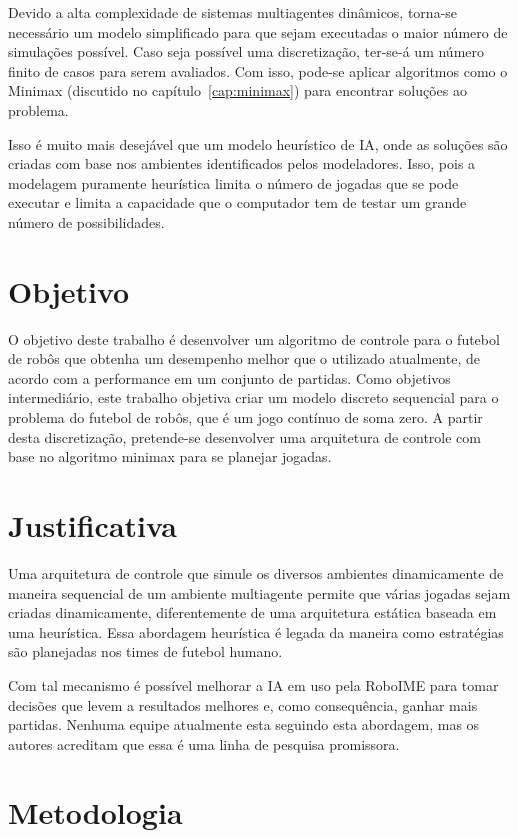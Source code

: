 Devido a alta complexidade de sistemas multiagentes dinâmicos, torna-se
necessário um modelo simplificado para que sejam executadas o maior número de
simulações possível.  Caso seja possível uma discretização, ter-se-á um número
finito de casos para serem avaliados. Com isso, pode-se aplicar algoritmos como
o Minimax (discutido no capítulo~\ref{cap:minimax}) para encontrar
soluções ao problema.

Isso é muito mais desejável que um modelo heurístico de IA, onde as soluções são
criadas com base nos ambientes identificados pelos modeladores. Isso, pois a
modelagem puramente heurística limita o número de jogadas que se pode executar e
limita a capacidade que o computador tem de testar um grande número de possibilidades.

\section{Objetivo}

O objetivo deste trabalho é desenvolver um algoritmo de controle para o futebol
de robôs que obtenha um desempenho melhor que o utilizado atualmente, de acordo
com a performance em um conjunto de partidas.
Como objetivos intermediário, este trabalho objetiva criar um modelo discreto
sequencial para o problema do futebol de robôs, que é um jogo contínuo de soma
zero.  A partir desta discretização, pretende-se desenvolver uma arquitetura de
controle com base no algoritmo minimax para se planejar jogadas.

\section{Justificativa}

Uma arquitetura de controle que simule os diversos ambientes dinamicamente de
maneira sequencial de um ambiente multiagente permite que várias jogadas sejam
criadas dinamicamente, diferentemente de uma arquitetura estática baseada em uma
heurística. Essa abordagem heurística é legada da maneira como estratégias são
planejadas nos times de futebol humano.

Com tal mecanismo é possível melhorar a IA em uso pela RoboIME para tomar
decisões que levem a resultados melhores e, como consequência, ganhar mais
partidas. Nenhuma equipe atualmente esta seguindo esta abordagem, mas os autores
acreditam que essa é uma linha de pesquisa promissora.

\section{Metodologia}

